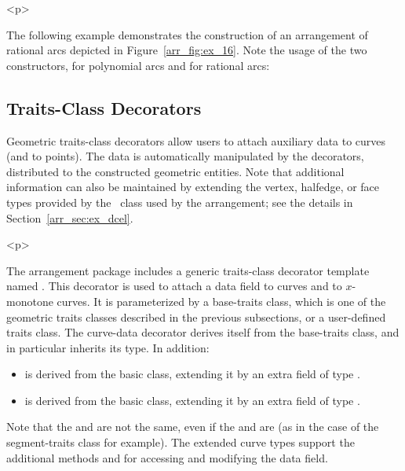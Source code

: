\begin{ccHtmlOnly}<p>\end{ccHtmlOnly}
The following example demonstrates the construction of an
arrangement of rational arcs depicted in
Figure~\ref{arr_fig:ex_16}. Note the usage of the two
constructors, for polynomial arcs and for rational arcs:


\subsection{Traits-Class Decorators}
\label{arr_ssec:meta_tr}
%
Geometric traits-class decorators allow users to attach auxiliary
data to curves (and to points). The data is automatically manipulated 
by the decorators, distributed to the constructed geometric entities. 
Note that additional information can also be maintained by extending 
the vertex, halfedge, or face types provided by the \dcel\ class used 
by the arrangement; see the details in Section~\ref{arr_sec:ex_dcel}.

\begin{ccHtmlOnly}<p>\end{ccHtmlOnly}
The arrangement package includes a generic traits-class decorator
template named 
.
This decorator is used to attach a data field to curves and to
$x$-monotone curves. It is parameterized by a base-traits class, which is
one of the geometric traits classes described in the previous subsections, or
a user-defined traits class. The curve-data decorator derives itself from the
base-traits class, and in particular inherits its  type.
In addition:
\begin{itemize}
\item {} is derived from the basic 
class, extending it by an extra field of type .
%
\item {} is derived from the basic
 class, extending it by an extra field of
type .
\end{itemize}
Note that the  and  are not
the same, even if the  and
 are (as in the case of the 
segment-traits class for example). The extended curve types support the
additional methods  and  for
accessing and modifying the data field.

